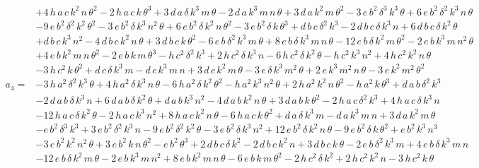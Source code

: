 \documentclass{article}
\begin{document}
\begin{align*}
    &+4\,h\,a\,c\,k^2\,n\,\theta ^2-2\,h\,a\,c\,k\,\theta ^3+3\,d\,a\,\delta \,k^3\,m\,\theta -2\,d\,a\,k^3\,m\,n\,\theta +3\,d\,a\,k^2\,m\,\theta ^2-3\,e\,b^2\,\delta ^3\,k^3\,\theta +6\,e\,b^2\,\delta ^2\,k^3\,n\,\theta \\
    &-9\,e\,b^2\,\delta ^2\,k^2\,\theta ^2-3\,e\,b^2\,\delta \,k^3\,n^2\,\theta +6\,e\,b^2\,\delta \,k^2\,n\,\theta ^2-3\,e\,b^2\,\delta \,k\,\theta ^3+d\,b\,c\,\delta ^2\,k^3-2\,d\,b\,c\,\delta \,k^3\,n+6\,d\,b\,c\,\delta \,k^2\,\theta \\
    &+d\,b\,c\,k^3\,n^2-4\,d\,b\,c\,k^2\,n\,\theta +3\,d\,b\,c\,k\,\theta ^2-6\,e\,b\,\delta ^2\,k^3\,m\,\theta +8\,e\,b\,\delta \,k^3\,m\,n\,\theta -12\,e\,b\,\delta \,k^2\,m\,\theta ^2-2\,e\,b\,k^3\,m\,n^2\,\theta \\
    &+4\,e\,b\,k^2\,m\,n\,\theta ^2-2\,e\,b\,k\,m\,\theta ^3-h\,c^2\,\delta ^2\,k^3+2\,h\,c^2\,\delta \,k^3\,n-6\,h\,c^2\,\delta \,k^2\,\theta -h\,c^2\,k^3\,n^2+4\,h\,c^2\,k^2\,n\,\theta \\
    &-3\,h\,c^2\,k\,\theta ^2+d\,c\,\delta \,k^3\,m-d\,c\,k^3\,m\,n+3\,d\,c\,k^2\,m\,\theta -3\,e\,\delta \,k^3\,m^2\,\theta +2\,e\,k^3\,m^2\,n\,\theta -3\,e\,k^2\,m^2\,\theta ^2\\
    a_{4}=&-3\,h\,a^2\,\delta ^2\,k^3\,\theta +4\,h\,a^2\,\delta \,k^3\,n\,\theta -6\,h\,a^2\,\delta \,k^2\,\theta ^2-h\,a^2\,k^3\,n^2\,\theta +2\,h\,a^2\,k^2\,n\,\theta ^2-h\,a^2\,k\,\theta ^3+d\,a\,b\,\delta ^2\,k^3\\
    &-2\,d\,a\,b\,\delta \,k^3\,n+6\,d\,a\,b\,\delta \,k^2\,\theta +d\,a\,b\,k^3\,n^2-4\,d\,a\,b\,k^2\,n\,\theta +3\,d\,a\,b\,k\,\theta ^2-2\,h\,a\,c\,\delta ^2\,k^3+4\,h\,a\,c\,\delta \,k^3\,n\\
    &-12\,h\,a\,c\,\delta \,k^2\,\theta -2\,h\,a\,c\,k^3\,n^2+8\,h\,a\,c\,k^2\,n\,\theta -6\,h\,a\,c\,k\,\theta ^2+d\,a\,\delta \,k^3\,m-d\,a\,k^3\,m\,n+3\,d\,a\,k^2\,m\,\theta \\
    &-e\,b^2\,\delta ^3\,k^3+3\,e\,b^2\,\delta ^2\,k^3\,n-9\,e\,b^2\,\delta ^2\,k^2\,\theta -3\,e\,b^2\,\delta \,k^3\,n^2+12\,e\,b^2\,\delta \,k^2\,n\,\theta -9\,e\,b^2\,\delta \,k\,\theta ^2+e\,b^2\,k^3\,n^3\\
    &-3\,e\,b^2\,k^2\,n^2\,\theta +3\,e\,b^2\,k\,n\,\theta ^2-e\,b^2\,\theta ^3+2\,d\,b\,c\,\delta \,k^2-2\,d\,b\,c\,k^2\,n+3\,d\,b\,c\,k\,\theta -2\,e\,b\,\delta ^2\,k^3\,m+4\,e\,b\,\delta \,k^3\,m\,n\\
    &-12\,e\,b\,\delta \,k^2\,m\,\theta -2\,e\,b\,k^3\,m\,n^2+8\,e\,b\,k^2\,m\,n\,\theta -6\,e\,b\,k\,m\,\theta ^2-2\,h\,c^2\,\delta \,k^2+2\,h\,c^2\,k^2\,n-3\,h\,c^2\,k\,\theta \\

\end{align*}
\end{document}
